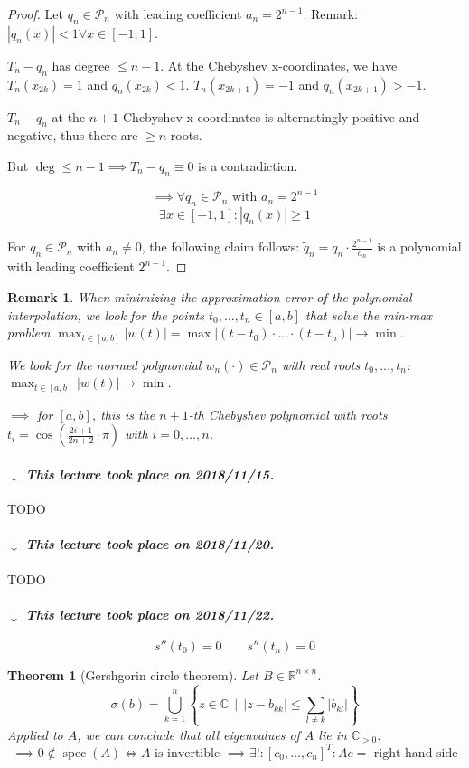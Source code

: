 \documentclass[a4paper]{article}
\newcounter{lecref}[section]
\numberwithin{lecref}{section}
\theoremstyle{break}
\newtheorem{thm}[lecref]{Theorem}
\newtheorem{remark}[lecref]{Remark}
\newcommand{\dateref}[1]{%
  \begin{mdframed}[backgroundcolor=gray!10,innerbottommargin=0pt,innertopmargin=0pt]
    \paragraph{\textit{$\downarrow$ This lecture took place on #1.}}%
  \end{mdframed}%
}
\newcommand{\Abs}[1]{\left|#1\right|}
\newcommand{\SetDef}[2]{\left\{#1\,\mid\,#2\right\}}
\DeclareMathOperator{\spec}{spec}
\begin{document}
\begin{proof}
  Let $q_n \in \mathcal P_n$ with leading coefficient $a_n = 2^{n-1}$.
  Remark: $\Abs{q_n(x)} < 1 \forall x \in [-1, 1]$.

  $T_n - q_n$ has degree $\leq n-1$.
  At the Chebyshev x-coordinates, we have $T_n(\tilde x_{2k}) = 1$ and $q_n(\tilde x_{2k}) < 1$.
  $T_n(\tilde x_{2k+1}) = -1$ and $q_n(\tilde x_{2k+1}) > -1$.

  $T_n - q_n$ at the $n+1$ Chebyshev x-coordinates is alternatingly positive and negative,
  thus there are $\geq n$ roots.

  But $\deg \leq n-1 \implies T_n - q_n \equiv 0$ is a contradiction.

  \[ \implies \forall q_n \in \mathcal P_n \text{ with } a_n = 2^{n-1} \]
  \[ \exists x \in [-1, 1]: \Abs{q_n(x)} \geq 1 \]

  For $q_n \in \mathcal P_n$ with $a_n \neq 0$, the following claim follows:
  $\tilde q_n = q_n \cdot \frac{2^{n-1}}{a_n}$ is a polynomial with leading coefficient $2^{n-1}$.
\end{proof}

\begin{remark}
  \label{remark:4-18}
  When minimizing the approximation error of the polynomial interpolation, we look for the points $t_0, \dots, t_n \in [a,b]$ that solve the min-max problem $\max_{t \in [a,b]} \Abs{w(t)} = \max{\Abs{(t - t_0) \cdot \dots \cdot (t - t_n)}} \to \min$.

  We look for the normed polynomial $w_n(\cdot) \in \mathcal P_n$ with real roots $t_0, \dots, t_n$: $\max_{t \in [a,b]} \Abs{w(t)} \to \min$.

  $\implies$ for $[a,b]$, this is the $n+1$-th Chebyshev polynomial with roots $t_i = \cos\left(\frac{2i+1}{2n+2} \cdot \pi\right)$ with $i = 0, \dots, n$.
\end{remark}

\dateref{2018/11/15}

TODO

\dateref{2018/11/20}

TODO

\dateref{2018/11/22}

\[ s''(t_0) = 0 \qquad s''(t_n) = 0 \]

\begin{thm}[Gershgorin circle theorem]
  Let $B \in \mathbb R^{n \times n}$.
  \[ \sigma(b) = \bigcup_{k=1}^n \SetDef{z \in \mathbb C}{\Abs{z - b_{kk}} \leq \sum_{l \neq k} \Abs{b_{kl}}} \]
  Applied to $A$, we can conclude that all eigenvalues of $A$ lie in $\mathbb C_{> 0}$.
  \[ \implies 0 \not\in \spec(A) \iff A \text{ is invertible } \implies \exists!: [c_0, \dots, c_n]^T: Ac = \text{ right-hand side} \]
\end{thm}
\end{document}
